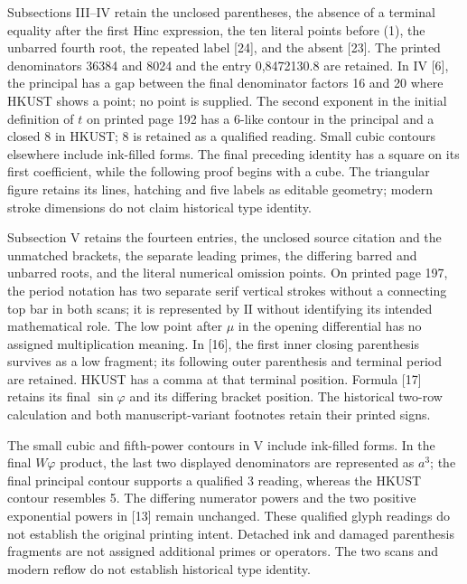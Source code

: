 Subsections III–IV retain the unclosed parentheses, the absence of a terminal equality after the first Hinc expression, the ten literal points before (1), the unbarred fourth root, the repeated label [24], and the absent [23]. The printed denominators 36384 and 8024 and the entry 0,8472130.8 are retained. In IV [6], the principal has a gap between the final denominator factors 16 and 20 where HKUST shows a point; no point is supplied. The second exponent in the initial definition of $t$ on printed page 192 has a 6-like contour in the principal and a closed 8 in HKUST; 8 is retained as a qualified reading. Small cubic contours elsewhere include ink-filled forms. The final preceding identity has a square on its first coefficient, while the following proof begins with a cube. The triangular figure retains its lines, hatching and five labels as editable geometry; modern stroke dimensions do not claim historical type identity.


Subsection V retains the fourteen entries, the unclosed source citation and the unmatched brackets, the separate leading primes, the differing barred and unbarred roots, and the literal numerical omission points. On printed page 197, the period notation has two separate serif vertical strokes without a connecting top bar in both scans; it is represented by $\mathrm{II}$ without identifying its intended mathematical role. The low point after $\mu$ in the opening differential has no assigned multiplication meaning. In [16], the first inner closing parenthesis survives as a low fragment; its following outer parenthesis and terminal period are retained. HKUST has a comma at that terminal position. Formula [17] retains its final $\sin\varphi$ and its differing bracket position. The historical two-row calculation and both manuscript-variant footnotes retain their printed signs.

The small cubic and fifth-power contours in V include ink-filled forms. In the final $W\varphi$ product, the last two displayed denominators are represented as $a^3$; the final principal contour supports a qualified 3 reading, whereas the HKUST contour resembles 5. The differing numerator powers and the two positive exponential powers in [13] remain unchanged. These qualified glyph readings do not establish the original printing intent. Detached ink and damaged parenthesis fragments are not assigned additional primes or operators. The two scans and modern reflow do not establish historical type identity.


